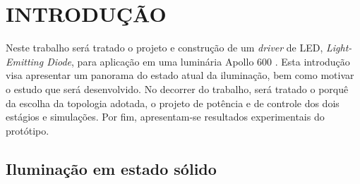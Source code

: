 \documentclass[
        12pt,
        openany, %
        oneside, %
        a4paper,			
        english,			
        brazil
        ]{abntbibufjf}
\begin{document}

\listoffigures*
\cleardoublepage





 
\tableofcontents*
\cleardoublepage



\textual
\pagestyle{simple}   


\chapter{INTRODUÇÃO}


Neste trabalho será tratado o projeto e construção de um \textit{driver} de LED, \textit{Light-Emitting Diode},  para aplicação em uma luminária Apollo 600 \cite{apollo}. Esta introdução visa apresentar um panorama do estado atual da iluminação, bem como motivar o estudo que será desenvolvido. No decorrer do trabalho, será tratado o porquê da escolha da topologia adotada, o projeto de potência e de controle dos dois estágios e simulações. Por fim, apresentam-se resultados experimentais do protótipo.

\section{Iluminação em estado sólido}
\end{document}

